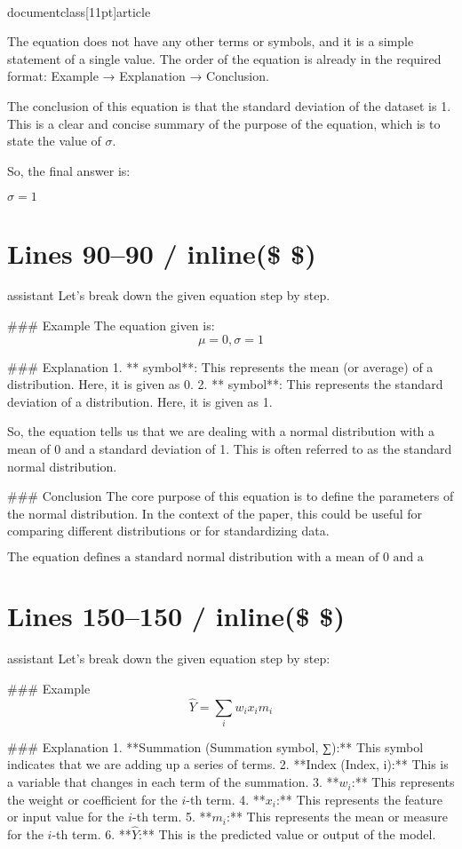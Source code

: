 \\documentclass[11pt]{article}
\begin{document}
The equation does not have any other terms or symbols, and it is a simple statement of a single value. The order of the equation is already in the required format: Example → Explanation → Conclusion.

The conclusion of this equation is that the standard deviation of the dataset is 1. This is a clear and concise summary of the purpose of the equation, which is to state the value of \(\sigma\).

So, the final answer is:

\(\boxed{\sigma = 1}\)


\section*{Lines 90–90 / inline(\$ \$) }
assistant
Let's break down the given equation step by step.

### Example
The equation given is:
\[
\mu = 0, \sigma = 1
\]

### Explanation
1. ** symbol**: This represents the mean (or average) of a distribution. Here, it is given as 0.
2. ** symbol**: This represents the standard deviation of a distribution. Here, it is given as 1.

So, the equation tells us that we are dealing with a normal distribution with a mean of 0 and a standard deviation of 1. This is often referred to as the standard normal distribution.

### Conclusion
The core purpose of this equation is to define the parameters of the normal distribution. In the context of the paper, this could be useful for comparing different distributions or for standardizing data.

\[
\boxed{\text{The equation defines a standard normal distribution with a mean of 0 and a standard deviation of 1.}}
\]


\section*{Lines 150–150 / inline(\$ \$) }
assistant
Let's break down the given equation step by step:

### Example
\[
\hat{Y} = \sum_i w_i x_i m_i
\]

### Explanation
1. **Summation (Summation symbol, ∑):** This symbol indicates that we are adding up a series of terms.
2. **Index (Index, i):** This is a variable that changes in each term of the summation.
3. **\( w_i \):** This represents the weight or coefficient for the \(i\)-th term.
4. **\( x_i \):** This represents the feature or input value for the \(i\)-th term.
5. **\( m_i \):** This represents the mean or measure for the \(i\)-th term.
6. **\( \hat{Y} \):** This is the predicted value or output of the model.
\end{document}
